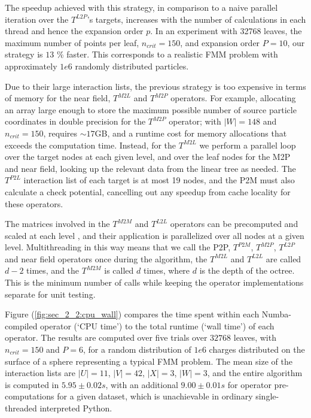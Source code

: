 The speedup achieved with this strategy, in comparison to a naive parallel iteration over the $T^{L2P}$'s targets, increases with the number of calculations in each thread and hence the expansion order $p$. In an experiment with 32768 leaves, the maximum number of points per leaf, $n_{crit} = 150$, and expansion order $P=10$, our strategy is $13$ \% faster. This corresponds to a realistic FMM problem with approximately $1e6$ randomly distributed particles.

Due to their large interaction lists, the previous strategy is too expensive in terms of memory for the near field, $T^{M2L}$ and $T^{M2P}$ operators. For example, allocating an array large enough to store the maximum possible number of source particle coordinates in double precision for the $T^{M2P}$ operator; with $|W|=148$ and $n_{crit}=150$, requires $\sim 17$GB, and a runtime cost for memory allocations that exceeds the computation time. Instead, for the $T^{M2L}$ we perform a parallel loop over the target nodes at each given level, and over the leaf nodes for the M2P and near field, looking up the relevant data from the linear tree as needed. The $T^{P2L}$ interaction list of each target is at most 19 nodes, and the P2M must also calculate a check potential, cancelling out any speedup from cache locality for these operators.

The matrices involved in the $T^{M2M}$ and $T^{L2L}$ operators can be precomputed and scaled at each level \cite{wang2021exafmm}, and their application is parallelized over all nodes at a given level. Multithreading in this way means that we call the P2P, $T^{P2M}$, $T^{M2P}$, $T^{L2P}$ and near field operators once during the algorithm, the $T^{M2L}$ and $T^{L2L}$ are called $d-2$ times, and the $T^{M2M}$ is called $d$ times, where $d$ is the depth of the octree. This is the minimum number of calls while keeping the operator implementations separate for unit testing.

Figure (\ref{fig:sec_2_2:cpu_wall}) compares the time spent within each Numba-compiled operator (`CPU time') to the total runtime (`wall time') of each operator. The results are computed over five trials over $32768$ leaves, with $n_{crit}=150$ and $P=6$, for a random distribution of $1e6$ charges distributed on the surface of a sphere representing a typical FMM problem. The mean size of the interaction lists are $|U|=11$, $|V|=42$, $|X|=3$, $|W|=3$, and the entire algorithm is computed in $5.95 \pm 0.02 s$, with an additional $9.00 \pm 0.01 s$ for operator pre-computations for a given dataset, which is unachievable in ordinary single-threaded interpreted Python.

